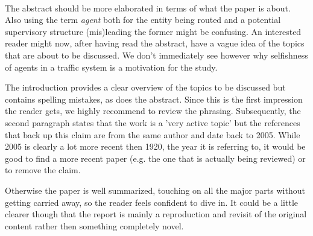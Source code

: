 \documentclass[../review.tex]{subfiles}
\begin{document}
 \textcolor{green}{\Large\checkmark}\\
The abstract should be more elaborated in terms of what the paper is about. Also using the term \textit{agent} both for the entity being routed and a potential supervisory structure (mis)leading the former might be confusing. An interested reader might now, after having read the abstract, have a vague idea of the topics that are about to be discussed. We don't immediately see however why selfishness of agents in a traffic system is a motivation for the study.

The introduction provides a clear overview of the topics to be discussed but contains spelling mistakes, as does the abstract. Since this is the first impression the reader gets, we highly recommend to review the phrasing. Subsequently, the second paragraph states that the work is a 'very active topic' but the references that back up this claim are from the same author and date back to 2005. While 2005 is clearly a lot more recent then 1920, the year it is referring to, it would be good to find a more recent paper (e.g. the one that is actually being reviewed) or to remove the claim.

Otherwise the paper is well summarized, touching on all the major parts without getting carried away, so the reader feels confident to dive in. It could be a little clearer though that the report is mainly a reproduction and revisit of the original content rather then something completely novel.
\end{document}
